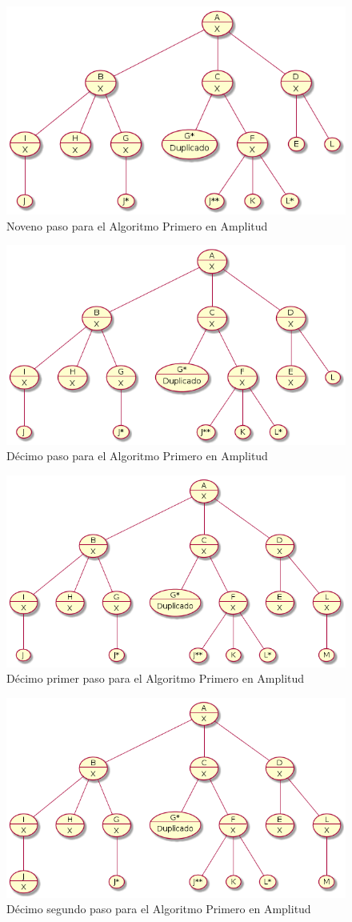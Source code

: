 \documentclass{article}
\begin{document}
\begin{figure}[H]
  \centering
  \includegraphics[width=.4\linewidth]{EJ4/ej4_008.png}
  \caption{Noveno paso para el Algoritmo Primero en Amplitud}
  \label{gr:g22}
\end{figure}

\begin{figure}[H]
  \centering
  \includegraphics[width=.4\linewidth]{EJ4/ej4_009.png}
  \caption{D\'ecimo paso para el Algoritmo Primero en Amplitud}
  \label{gr:g23}
\end{figure}

\begin{figure}[H]
  \centering
  \includegraphics[width=.4\linewidth]{EJ4/ej4_010.png}
  \caption{D\'ecimo primer paso para el Algoritmo Primero en Amplitud}
  \label{gr:g24}
\end{figure}

\begin{figure}[H]
  \centering
  \includegraphics[width=.4\linewidth]{EJ4/ej4_011.png}
  \caption{D\'ecimo segundo paso para el Algoritmo Primero en Amplitud}
  \label{gr:g25}
\end{figure}
\end{document}
